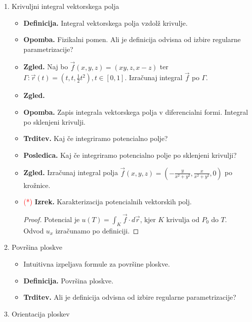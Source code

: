 \begin{enumerate}
    \item Krivuljni integral vektorskega polja
    \begin{itemize}
        \item \textbf{Definicija.} Integral vektorskega polja vzdolž krivulje.
        \item \textbf{Opomba.} Fizikalni pomen. Ali je definicija odvisna od izbire regularne parametrizacije?
        \item \textbf{Zgled.} Naj bo \(\vec{f}(x,y,z) = (xy, z, x- z)\) ter \(\Gamma: \vec{r}(t) = (t, t, \frac{1}{2}t^2), t \in [0,1]\). Izračunaj integral \(\vec{f}\) po \(\Gamma\).
        \item \textbf{Zgled.} 
        \item \textbf{Opomba.} Zapis integrala vektorskega polja v diferencialni formi. Integral po sklenjeni krivulji. 
        \item \textbf{Trditev.} Kaj če integriramo potencialno polje?
        \item \textbf{Posledica.} Kaj če integriramo potencialno polje po sklenjeni krivulji?
        \item \textbf{Zgled.} Izračunaj integral polja \(\vec{f}(x,y,z) = \left(-\frac{y}{x^2 + y^2}, \frac{x}{x^2+y^2}, 0\right)\) po krožnice.
        \item \textcolor{red}{(*)} \textbf{Izrek.} Karakterizacija potencialnih vektorskih polj.
        \begin{proof}
            Potencial je \(u(T) = \int_{K} \vec{f} \cdot d\vec{r}\), kjer \(K\) krivulja od \(P_0\) do \(T\). Odvod \(u_x\) izračunamo po definiciji.
        \end{proof}
    \end{itemize}

    \item Površina ploskve
    \begin{itemize}
        \item Intuitivna izpeljava formule za površine ploskve.
        \item \textbf{Definicija.} Površina ploskve.
        \item \textbf{Trditev.} Ali je definicija odvisna od izbire regularne parametrizacije?
    \end{itemize}

    \item Orientacija ploskev
    

\end{enumerate}
